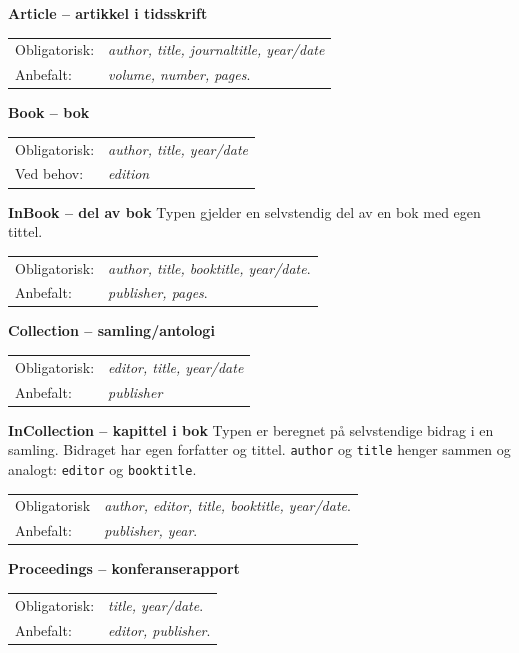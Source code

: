 \documentclass[11pt,norsk,a4paper]{article}
\newcommand{\bt}{BibTeX{}}
\newcommand{\underskrift}[1]{\vspace{.2cm}\noindent\textbf{#1}\newline}
\newcommand{\flipp}{\vspace{0.1cm}\newline\indent}
\newcommand{\mnd}{Obligatorisk}
\begin{document}
\underskrift{Article -- artikkel i tidsskrift}
\indent\begin{tabular}{ll}
\mnd:&\textit{author, title, journaltitle, year/date}\\
Anbefalt:& \textit{volume, number, pages}.\\ 
\end{tabular}

\underskrift{Book -- bok}
\indent\begin{tabular}{ll}
\mnd:&\textit{author, title, year/date}\\
Ved behov: &\textit{edition}\\
\end{tabular}

\underskrift{InBook -- del av  bok}
\noindent{}Typen gjelder en selvstendig del av en bok med egen tittel.
\flipp\begin{tabular}{ll}
\mnd:&\textit{author, title, booktitle, year/date}.\\
Anbefalt: &\textit{publisher, pages}.\\
\end{tabular}

\underskrift{Collection -- samling/antologi}
\indent\begin{tabular}{ll}
\mnd:&\textit{editor, title, year/date}\\
Anbefalt:&\textit{publisher}\\ 
\end{tabular}

\underskrift{InCollection -- kapittel i bok}
\noindent{}Typen er beregnet på selvstendige bidrag i en samling. Bidraget har egen forfatter og tittel. \texttt{author} og \texttt{title} henger sammen og analogt: \texttt{editor} og \texttt{booktitle}.\flipp\begin{tabular}{ll}
\mnd&\textit{author, editor, title, booktitle, year/date}. \\
Anbefalt: &\textit{publisher, year}.\\ 
\end{tabular}

\underskrift{Proceedings -- konferanserapport}
\indent\begin{tabular}{ll}
\mnd:&\textit{title, year/date}. \\
Anbefalt: &\textit{editor, publisher}.\\ 
\end{tabular}
\end{document}
